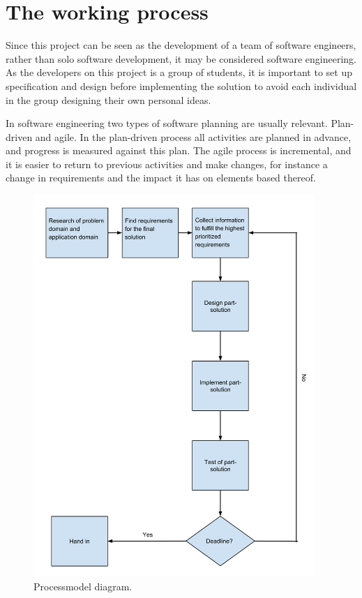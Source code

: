 \chapter{The working process}
Since this project can be seen as the development of a team of software engineers, rather than solo software development, it may be considered software engineering. As the developers on this project is a group of students, it is important to set up specification and design before implementing the solution  to avoid each individual in the group designing their own personal ideas.

In software engineering two types of software planning are usually relevant. Plan-driven and agile. In the plan-driven process all activities are planned in advance, and progress is measured against this plan. The agile process is incremental, and it is easier to return to previous activities and make changes, for instance a change in requirements and the impact it has on elements based thereof.

\begin{figure}[h!]
\centering
\includegraphics[width=0.95\textwidth]{figures/ProcessmodelDiagram.png}
\caption{Processmodel diagram.}
\label{fig:processmodelDiagram}
\end{figure}

